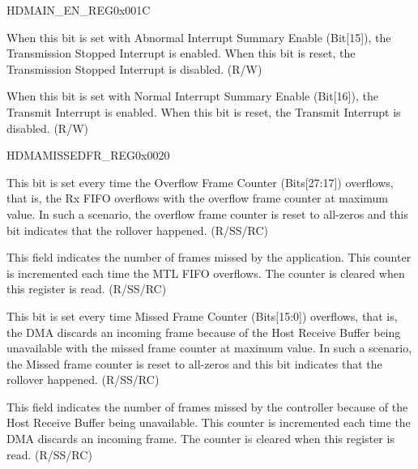 \begin{register}{H}{DMAIN\_EN\_REG}{0x001C}
\begin{regdesc}
\begin{reglist}
\item [DMAIN\_TSE]When this bit is set with Abnormal Interrupt Summary Enable (Bit[15]), the Transmission Stopped Interrupt is enabled. When this bit is reset, the Transmission Stopped Interrupt is disabled. (R/W)
\item [DMAIN\_TIE]When this bit is set with Normal Interrupt Summary Enable (Bit[16]), the Transmit Interrupt is enabled. When this bit is reset, the Transmit Interrupt is disabled. (R/W)
\end{reglist}\end{regdesc}
\end{register}


\begin{register}{H}{DMAMISSEDFR\_REG}{0x0020}\label{regdesc:DMAMISSEDFRREG}
%
%
%
%
%
\regnewline%
\begin{regdesc}\begin{reglist}
\item [Overflow\_BFOC]This bit is set every time the Overflow Frame Counter (Bits[27:17]) overflows, that is, the Rx FIFO overflows with the overflow frame counter at maximum value. In such a scenario, the overflow frame counter is reset to all-zeros and this bit indicates that the rollover happened. (R/SS/RC)
\item [Overflow\_FC]This field indicates the number of frames missed by the application. This counter is incremented each time the MTL FIFO overflows. The counter is cleared when this register is read. (R/SS/RC)
\item [Overflow\_BMFC]This bit is set every time Missed Frame Counter (Bits[15:0]) overflows, that is, the DMA discards an incoming frame because of the Host Receive  Buffer being unavailable with the missed frame counter at maximum value. In such a scenario, the Missed frame counter is reset to all-zeros and this bit indicates that the rollover happened. (R/SS/RC)
\item [Missed\_FC] This field indicates the number of frames missed by the controller because of the Host Receive Buffer being unavailable. This counter is incremented each time the DMA discards an incoming frame. The counter is cleared when this register is read. (R/SS/RC)
\end{reglist}\end{regdesc}
\end{register}


